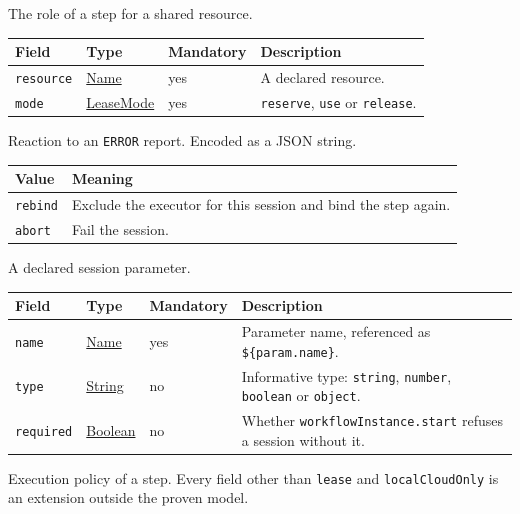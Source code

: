\documentclass[a4paper]{arrowhead}
\newcommand{\mref}[1]{{\textcolor{ArrowheadPurple}{\hyperref[sec:model:#1]{#1}}}}
\newcommand{\pref}[1]{{\textcolor{ArrowheadGrey}{\hyperref[sec:model:primitives:#1]{#1}}}}
\begin{document}
The role of a step for a shared resource.

{\small
\begin{longtable}{|p{3.7cm}|p{4.2cm}|p{1.6cm}|p{6.3cm}|}

\hline
\rowcolor{gray!33} Field & Type & Mandatory & Description \\ \hline
\endhead
\texttt{resource} & \pref{Name} & yes & A declared resource. \\ \hline
\texttt{mode} & \mref{LeaseMode} & yes & \texttt{reserve}, \texttt{use} or \texttt{release}. \\ \hline
\end{longtable}
}

Reaction to an \texttt{ERROR} report.
 Encoded as a JSON string.
{\small
\begin{longtable}{|p{3.9cm}|p{11.9cm}|}

\hline
\rowcolor{gray!33} Value & Meaning \\ \hline
\endhead
\texttt{rebind} & Exclude the executor for this session and bind the step again. \\ \hline
\texttt{abort} & Fail the session. \\ \hline
\end{longtable}
}

A declared session parameter.

{\small
\begin{longtable}{|p{3.7cm}|p{4.2cm}|p{1.6cm}|p{6.3cm}|}

\hline
\rowcolor{gray!33} Field & Type & Mandatory & Description \\ \hline
\endhead
\texttt{name} & \pref{Name} & yes & Parameter name, referenced as \texttt{\$\{param.name\}}. \\ \hline
\texttt{type} & \pref{String} & no & Informative type: \texttt{string}, \texttt{number}, \texttt{boolean} or \texttt{object}. \\ \hline
\texttt{required} & \pref{Boolean} & no & Whether \texttt{workflowInstance.start} refuses a session without it. \\ \hline
\end{longtable}
}

Execution policy of a step. Every field other than \texttt{lease} and \texttt{localCloudOnly} is an extension outside the proven model.
\end{document}
